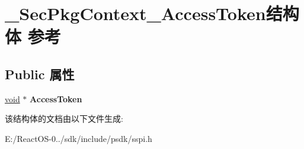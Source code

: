 \hypertarget{struct___sec_pkg_context___access_token}{}\section{\+\_\+\+Sec\+Pkg\+Context\+\_\+\+Access\+Token结构体 参考}
\label{struct___sec_pkg_context___access_token}
\subsection*{Public 属性}
\begin{DoxyCompactItemize}
\item 
\mbox{\label{struct___sec_pkg_context___access_token_a22b80b0b1f7c79f60f3d8d0fdd7299f4}} 
\hyperlink{interfacevoid}{void} $\ast$ {\bfseries Access\+Token}
\end{DoxyCompactItemize}


该结构体的文档由以下文件生成\+:\begin{DoxyCompactItemize}
\item 
E\+:/\+React\+O\+S-\/0../sdk/include/psdk/sspi.\+h\end{DoxyCompactItemize}
